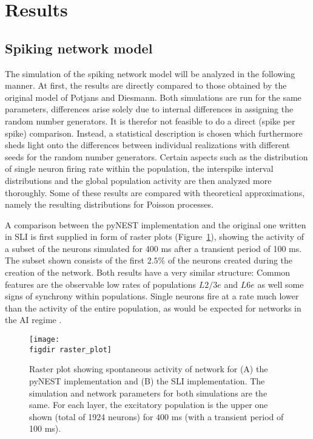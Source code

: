 \section{Results}
\label{sec:results}

\subsection{Spiking network model}
The simulation of the spiking network model will be analyzed in the following manner. 
At first, the results are directly compared to those obtained by the original 
model of Potjans and Diesmann. Both simulations are run for the same parameters, 
differences arise solely due to internal differences in assigning the random 
number generators. It is therefor not feasible to do a direct (spike per spike) 
comparison. Instead, a statistical description is chosen which furthermore sheds light
onto the differences between individual realizations with different seeds for the 
random number generators. Certain aspects such as
the distribution of single neuron firing rate within the population, 
the interspike interval distributions and the global population activity 
are then analyzed more thoroughly. Some of these  results are compared with 
theoretical approximations, namely the resulting distributions 
for Poisson processes.

A comparison between the pyNEST implementation and the original one written in SLI
is first supplied in form of raster plots (Figure~\ref{fig:raster_plot}), 
showing the activity of a subset of the neurons simulated for 400 ms 
after a transient period of 100 ms. The subset shown consists of the first 
$2.5 \%$ of the neurons created during the creation of the network. 
Both results have a very similar structure: Common features are the observable low 
rates of populations $L2/3e$ and $L6e$ as well some signs of synchrony within populations. 
Single neurons fire at a rate much lower than the activity of the 
entire population, as would be expected for networks in the AI regime \cite{brunel2000}. 
\begin{figure}[htpb]
    \centering
    \texttt{[image: \\figdir raster\_plot]}
    \caption{Raster plot showing spontaneous activity of network for 
        (A) the pyNEST implementation and (B) the SLI implementation.
        The simulation and network parameters for both simulations are 
        the same. 
        For each layer, the excitatory population is the upper one shown 
        (total of 1924 neurons) for $400$ ms (with a transient period of 100 ms). 
    }
    \label{fig:raster_plot}
\end{figure}

